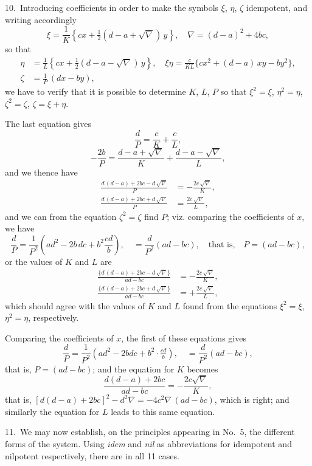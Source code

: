 \documentclass[11pt,a4paper]{book}
\begin{document}
\medskip

10.~Introducing coefficients in order to make the symbols $\xi$, $\eta$, $\zeta$ idempotent, and writing accordingly
\[
\xi = \frac{1}{K}\left\{cx + \tfrac{1}{2}(d-a+\sqrt{\nabla})\,y\right\},\quad \nabla = (d-a)^2 + 4bc,
\]
so that
\begin{align*}
\eta &= \frac{1}{L}\left\{cx + \tfrac{1}{2}(d-a-\sqrt{\nabla})\,y\right\},\quad \xi\eta = \frac{c}{KL}\{cx^2 + (d-a)\,xy - by^2\},\\
\zeta &= \frac{1}{P}\,(dx - by),
\end{align*}
we have to verify that it is possible to determine $K$, $L$, $P$ so that $\xi^2 = \xi$, $\eta^2 = \eta$, $\zeta^2 = \zeta$, $\zeta = \xi + \eta$.

The last equation gives
\[
\frac{d}{P} = \frac{c}{K} + \frac{c}{L},
\]
\[
-\frac{2b}{P} = \frac{d-a+\sqrt{\nabla}}{K} + \frac{d-a-\sqrt{\nabla}}{L},
\]
and we thence have
\begin{align*}
\frac{d\,(d-a) + 2bc - d\,\sqrt{\nabla}}{P} &= -\frac{2c\,\sqrt{\nabla}}{K},\\
\frac{d\,(d-a) + 2bc + d\,\sqrt{\nabla}}{P} &= \frac{2c\,\sqrt{\nabla}}{L},
\end{align*}
and we can from the equation $\zeta^2 = \zeta$ find $P$; viz. comparing the coefficients of $x$, we have
\[
\frac{d}{P} = \frac{1}{P^2}\left(ad^2 - 2b\,dc + b^2\frac{cd}{b}\right),\quad = \frac{d}{P^2}(ad-bc),\quad \text{that is,}\quad P = (ad-bc),
\]
or the values of $K$ and $L$ are
\begin{align*}
\frac{\{d\,(d-a) + 2bc - d\,\sqrt{\nabla}\}}{ad-bc} &= -\frac{2c\,\sqrt{\nabla}}{K},\\
\frac{\{d\,(d-a) + 2bc + d\,\sqrt{\nabla}\}}{ad-bc} &= +\frac{2c\,\sqrt{\nabla}}{L},
\end{align*}
which should agree with the values of $K$ and $L$ found from the equations $\xi^2 = \xi$, $\eta^2 = \eta$, respectively.

Comparing the coefficients of $x$, the first of these equations gives
\[
\frac{d}{P} = \frac{1}{P^2}(ad^2 - 2bdc + b^2\cdot\tfrac{cd}{b}),\quad = \frac{d}{P^2}(ad-bc),
\]
that is, $P = (ad-bc)$; and the equation for $K$ becomes
\[
\frac{d(d-a)+2bc}{ad-bc} = -\frac{2c\sqrt{\nabla}}{K},
\]
that is, $[d(d-a)+2bc]^2 - d^2\nabla = -4c^2\nabla\,(ad-bc)$, which is right; and similarly the equation for $L$ leads to this same equation.

11.~We may now establish, on the principles appearing in No.~5, the different forms of the system. Using \textit{idem} and \textit{nil} as abbreviations for idempotent and nilpotent respectively, there are in all 11 cases.
\end{document}
